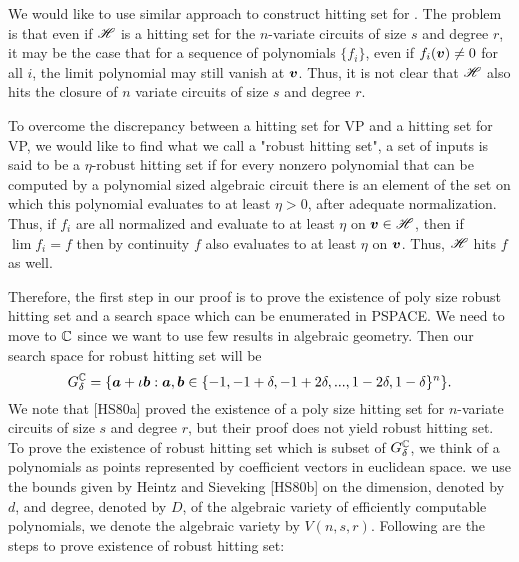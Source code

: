 {We would like to use similar approach to construct hitting set for . The problem is that even if $\mathscr{H}$ is a hitting set for the $n$-variate circuits of size $s$ and degree $r$, it may be the case that for a sequence of polynomials $\{f_i\}$, even if $f_i(\bm v)\ne 0$ for all $i$, the limit polynomial may still vanish at $\bm v$. Thus, it is not clear that $\mathscr{H}$ also hits the closure of $n$ variate circuits of size $s$ and degree $r$.

To overcome the discrepancy between a hitting set for VP and a hitting set for VP, we would like to find what we call a "robust hitting set", a set of inputs is said to be a $\eta$-robust hitting set if for every nonzero polynomial that can be computed by a polynomial sized algebraic circuit there is an element of the set on which this polynomial evaluates to at least $\eta>0$, after adequate normalization. Thus, if $f_i$ are all normalized and evaluate to at least $\eta$ on $\bm v\in\mathscr{H}$, then if $\lim f_i=f$ then by continuity $f$ also evaluates to at least $\eta$ on $\bm v$. Thus, $\mathscr{H}$ hits $f$ as well.

Therefore, the first step in our proof is to prove the existence of poly size robust hitting set and a search space which can be enumerated in PSPACE. We need to move to $\mathbb{C}$ since we want to use few results in algebraic geometry. Then our search space for robust hitting set will be $$G_\delta^{\mathbb{C}}=\{\bm a+\iota\bm b:\bm a,\bm b\in \{-1,-1+\delta,-1+2\delta,...,1-2\delta,1-\delta\}^n\}.$$ We note that [HS80a] proved the existence of a poly size hitting set for $n$-variate circuits of size $s$ and degree $r$, but their proof does not yield robust hitting set. To prove the existence of robust hitting set which is subset of $G_\delta^{\mathbb{C}}$, we think of a polynomials as points represented by coefficient vectors in euclidean space. we use the bounds given by Heintz and Sieveking [HS80b] on the dimension, denoted by $d$, and degree, denoted by $D$, of the algebraic variety of efficiently computable polynomials, we denote the algebraic variety by $V(n,s,r)$. Following are the steps to prove existence of robust hitting set:

}
